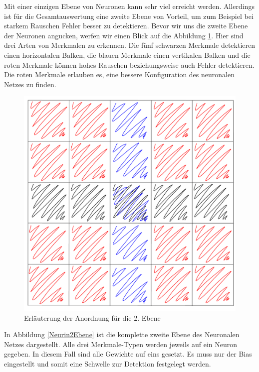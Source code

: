 Mit einer einzigen Ebene von Neuronen kann sehr viel erreicht werden. Allerdings ist für die Gesamtauswertung eine zweite Ebene von Vorteil, um zum Beispiel bei starkem Rauschen Fehler besser zu detektieren. Bevor wir uns die zweite Ebene der Neuronen angucken, werfen wir einen Blick auf die Abbildung \ref{Erl2Ebene}. Hier sind drei Arten von Merkmalen zu erkennen. Die fünf schwarzen Merkmale detektieren einen horizontalen Balken, die blauen Merkmale einen vertikalen Balken und die roten Merkmale können hohes Rauschen beziehungsweise auch Fehler detektieren. Die roten Merkmale erlauben es, eine bessere Konfiguration des neuronalen Netzes zu finden.

\begin{figure}[hbt]
	\centering
	\includegraphics[width=0.6\linewidth]{./Bilder/Auswertung/Aufbau/page6}
	\caption{Erläuterung der Anordnung für die 2. Ebene}
	\label{Erl2Ebene}
\end{figure}

In Abbildung \ref{Neurin2Ebene} ist die komplette zweite Ebene des Neuronalen Netzes dargestellt. Alle drei Merkmale-Typen werden jeweils auf ein Neuron gegeben. In diesem Fall sind alle Gewichte auf eins gesetzt. Es muss nur der Bias eingestellt und somit eine Schwelle zur Detektion festgelegt werden. 

